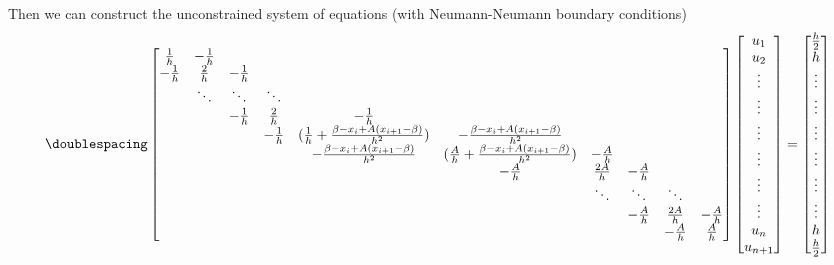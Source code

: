\documentclass[12pt]{article}
\begin{document}
Then we can construct the unconstrained system of equations (with Neumann-Neumann boundary conditions)
\[
\doublespacing
\begin{bmatrix}
\frac{1}{h} & -\frac{1}{h} \\
-\frac{1}{h} & \frac{2}{h} & -\frac{1}{h} \\
& \ddots & \ddots & \ddots\\
&& -\frac{1}{h} & \frac{2}{h} & -\frac{1}{h}\\
&&& -\frac{1}{h} & (\frac{1}{h}+\frac{\beta-x_{i}+A(x_{i+1}-\beta)}{h^2}) & -\frac{\beta-x_{i}+A(x_{i+1}-\beta)}{h^2}\\
&&&& -\frac{\beta-x_{i}+A(x_{i+1}-\beta)}{h^2} & (\frac{A}{h}+\frac{\beta-x_{i}+A(x_{i+1}-\beta)}{h^2}) & -\frac{A}{h}\\
&&&&& -\frac{A}{h} & \frac{2A}{h} & -\frac{A}{h}\\
&&&&&& \ddots & \ddots & \ddots\\
&&&&&&& -\frac{A}{h} & \frac{2A}{h} & -\frac{A}{h}\\
&&&&&&&&  -\frac{A}{h} & \frac{A}{h}
\end{bmatrix}
\begin{bmatrix}
u_{1}\\
u_{2}\\
\vdots\\
\vdots\\
\vdots\\
\vdots\\
\vdots\\
\vdots\\
u_{n}\\
u_{n+1}
\end{bmatrix}=
\begin{bmatrix}
\frac{h}{2}\\
h\\
\vdots\\
\vdots\\
\vdots\\
\vdots\\
\vdots\\
\vdots\\
h\\
\frac{h}{2}
\end{bmatrix}
\]
\end{document}
